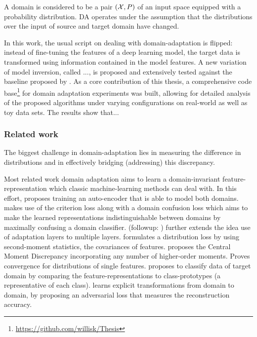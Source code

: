 A domain is considered to be a pair $(\mathcal X, P)$ of an input space equipped with a probability distribution. DA operates under the assumption that the distributions over the input of source and target domain have changed.

In this work, the usual script on dealing with domain-adaptation is flipped: instead of fine-tuning the features of a deep learning model, the target data is transformed using information contained in the model features. 
A new variation of model inversion, called ..., is proposed and extensively tested against the baseline proposed by \cite{}. 
As a core contribution of this thesis, a comprehensive code base\footnote{\url{https://github.com/willisk/Thesis}} for domain adaptation experiments was built, allowing for detailed analysis of the proposed algorithms under varying configurations on real-world as well as toy data sets.
The results show that...


\subsubsection{Related work}

The biggest challenge in domain-adaptation lies in measuring the difference in distributions
and in effectively bridging (addressing) this discrepancy.

Most related work domain adaptation 
aims to learn a domain-invariant feature-representation
which classic machine-learning methods can deal with.
In this effort, \cite{DA_AE} proposes training an auto-encoder that is able to model both domains.
\cite{DA_Deep_Transfer} makes use of the criterion loss along with a 
domain confusion loss 
which aims to make the learned representations indistinguishable between domains 
by maximally confusing a domain classifier.
(followup: \cite{DA_Confusion_MMD})
\cite{DA_MMD} further extends the idea use of adaptation layers to multiple layers.
\cite{Deep_Coral} formulates a distribution loss by using second-moment statistics, the covariances of features.
\cite{DA_CMD} proposes the Central Moment Discrepancy incorporating any number of higher-order moments.
Proves convergence for distributions of single features.
\cite{DA_Prototypes} proposes to classify data of target domain by comparing the feature-representations to
class-prototypes (a representative of each class).
\cite{DA_CycleGAN} learns explicit transformations from domain to domain, by proposing an adversarial loss
that measures the reconstruction accuracy.

